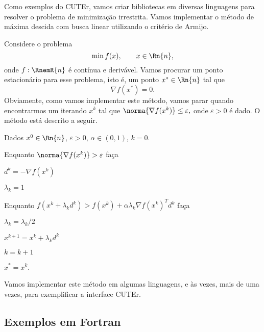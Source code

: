 \documentclass[letterpaper,11pt]{article}
\numberwithin{equation}{section}
\begin{document}
Como exemplos do CUTEr, vamos criar bibliotecas em diversas linguagens para resolver o 
problema de minimização irrestrita. 
Vamos implementar o método de máxima descida com busca linear utilizando o
critério de Armijo.

Considere o problema
\begin{equation}
 \min f(x), \qquad x \in \Rn{n},
\end{equation}
onde $f:\RnemR{n}$ é contínua e derivável. Vamos procurar um ponto estacionário para esse
problema, isto é, um ponto $x^* \in \Rn{n}$ tal que $$\nabla f(x^*) = 0.$$
Obviamente, como vamos implementar este método, vamos parar quando encontrarmos um
iterando $x^k$ tal que $\norma{\nabla f(x^k)} \leq \varepsilon,$ onde $\varepsilon > 0$ é
dado. O método está descrito a seguir.
\begin{algorithm}
 \item Dados $x^0 \in \Rn{n}$, $\varepsilon > 0$, $\alpha \in (0,1)$, $k = 0$.
 \item Enquanto $\norma{\nabla f(x^k)} > \varepsilon$ faça
 \begin{algorithm} 
  \item $d^k = -\nabla f(x^k)$
  \item $\lambda_k = 1$
  \item Enquanto $f(x^k + \lambda_kd^k) > f(x^k) + \alpha \lambda_k \nabla f(x^k)^Td^k$ faça
  \begin{algorithm}
   \item $\lambda_k = \lambda_k/2$
  \end{algorithm}
  \item $x^{k+1} = x^k + \lambda_kd^k$
  \item $k = k + 1$
 \end{algorithm}
 \item $x^* = x^k$.
\end{algorithm}
Vamos implementar este método em algumas linguagens, e às vezes, mais de uma vezes, para
exemplificar a interface CUTEr.

\subsection{Exemplos em Fortran}
\end{document}
